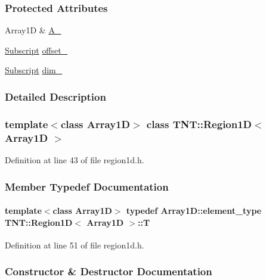 \subsubsection*{Protected Attributes}
\begin{DoxyCompactItemize}
\item 
Array1D \& \hyperlink{class_t_n_t_1_1_region1_d_a4c4daf08ea2797496584ea6d2cd7c18e}{A\_\-}
\item 
\hyperlink{namespace_t_n_t_af22e3f1460e145c04ce4e7d701e4c1c1}{Subscript} \hyperlink{class_t_n_t_1_1_region1_d_a2b432162eac654e84e7ef6b780d3dea1}{offset\_\-}
\item 
\hyperlink{namespace_t_n_t_af22e3f1460e145c04ce4e7d701e4c1c1}{Subscript} \hyperlink{class_t_n_t_1_1_region1_d_a83591fa19807181bc1433f8d03ec0d3a}{dim\_\-}
\end{DoxyCompactItemize}


\subsubsection{Detailed Description}
\subsubsection*{template$<$class Array1D$>$ class TNT::Region1D$<$ Array1D $>$}



Definition at line 43 of file region1d.h.



\subsubsection{Member Typedef Documentation}
\paragraph[{T}]{\setlength{\rightskip}{0pt plus 5cm}template$<$class Array1D$>$ typedef Array1D::element\_\-type {\bf TNT::Region1D}$<$ Array1D $>$::{\bf T}}\hfill\label{class_t_n_t_1_1_region1_d_aeaa00e15430d932464854304c140396f}


Definition at line 51 of file region1d.h.



\subsubsection{Constructor \& Destructor Documentation}
